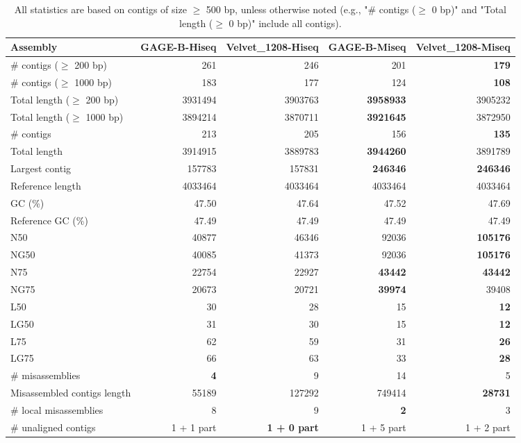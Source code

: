\documentclass[12pt,a4paper]{article}
\begin{document}
\begin{table}[ht]
\begin{center}
\caption{All statistics are based on contigs of size $\geq$ 500 bp, unless otherwise noted (e.g., "\# contigs ($\geq$ 0 bp)" and "Total length ($\geq$ 0 bp)" include all contigs).}
\begin{tabular}{|l*{4}{|r}|}
\hline
Assembly & GAGE-B-Hiseq & Velvet\_1208-Hiseq & GAGE-B-Miseq & Velvet\_1208-Miseq \\ \hline
\# contigs ($\geq$ 200 bp) & 261 & 246 & 201 & {\bf 179} \\ \hline
\# contigs ($\geq$ 1000 bp) & 183 & 177 & 124 & {\bf 108} \\ \hline
Total length ($\geq$ 200 bp) & 3931494 & 3903763 & {\bf 3958933} & 3905232 \\ \hline
Total length ($\geq$ 1000 bp) & 3894214 & 3870711 & {\bf 3921645} & 3872950 \\ \hline
\# contigs & 213 & 205 & 156 & {\bf 135} \\ \hline
Total length & 3914915 & 3889783 & {\bf 3944260} & 3891789 \\ \hline
Largest contig & 157783 & 157831 & {\bf 246346} & {\bf 246346} \\ \hline
Reference length & 4033464 & 4033464 & 4033464 & 4033464 \\ \hline
GC (\%) & 47.50 & 47.64 & 47.52 & 47.69 \\ \hline
Reference GC (\%) & 47.49 & 47.49 & 47.49 & 47.49 \\ \hline
N50 & 40877 & 46346 & 92036 & {\bf 105176} \\ \hline
NG50 & 40085 & 41373 & 92036 & {\bf 105176} \\ \hline
N75 & 22754 & 22927 & {\bf 43442} & {\bf 43442} \\ \hline
NG75 & 20673 & 20721 & {\bf 39974} & 39408 \\ \hline
L50 & 30 & 28 & 15 & {\bf 12} \\ \hline
LG50 & 31 & 30 & 15 & {\bf 12} \\ \hline
L75 & 62 & 59 & 31 & {\bf 26} \\ \hline
LG75 & 66 & 63 & 33 & {\bf 28} \\ \hline
\# misassemblies & {\bf 4} & 9 & 14 & 5 \\ \hline
Misassembled contigs length & 55189 & 127292 & 749414 & {\bf 28731} \\ \hline
\# local misassemblies & 8 & 9 & {\bf 2} & 3 \\ \hline
\# unaligned contigs & 1 + 1 part & {\bf 1 + 0 part} & 1 + 5 part & 1 + 2 part \\ \hline

\end{tabular}
\end{center}
\end{table}
\end{document}
